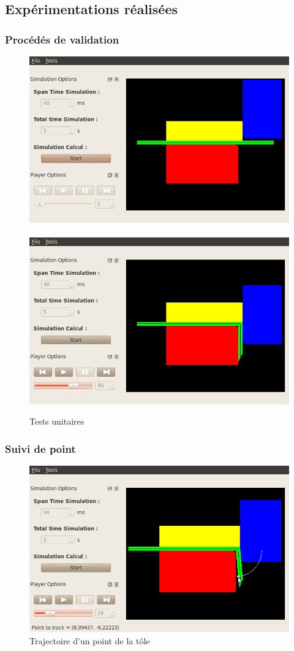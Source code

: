 \documentclass{beamer}
\begin{document}
\subsection{Expérimentations réalisées}
\begin{frame}
    \frametitle{Procédés de validation}
    \begin{figure}
        \includegraphics[width=.45\textwidth]{img/fenetreInitiale.png}$~~~$
        \includegraphics[width=.45\textwidth]{img/fenetreInitiale2.png}
        \caption{Tests unitaires}
    \end{figure}
\end{frame}
\begin{frame}
    \frametitle{Suivi de point}
    \begin{figure}
        \includegraphics[width=.8\textwidth]{img/tracking.png}
        \caption{Trajectoire d'un point de la tôle}
    \end{figure}
\end{frame}
\end{document}
